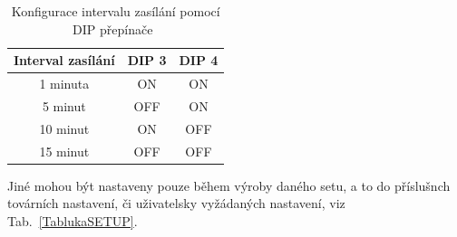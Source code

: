 \newpage{}

\begin{table}[!ht]
\centering
\caption{Konfigurace intervalu zasílání pomocí DIP přepínače~\cite{CidloWeptech}}
\label{TablukaDIP}
\begin{tabular}{|c|c|c|}
\hline
\textbf{Interval zasílání} & DIP 3 & DIP 4 \\ \hline
1 minuta & ON & ON \\ \hline
5 minut & OFF & ON \\ \hline
10 minut & ON & OFF \\ \hline
15 minut & OFF & OFF \\ \hline
\end{tabular}
\end{table}

Jiné mohou být nastaveny pouze během výroby daného setu, a to do příslušnch továrních nastavení, či uživatelsky vyžádaných nastavení, viz Tab.~\ref{TablukaSETUP}.


